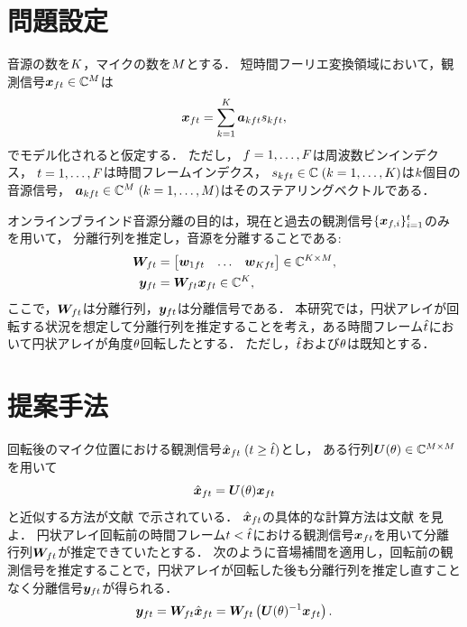 \documentclass{article}
\begin{document}
\section{問題設定}
音源の数を$K$，マイクの数を$M$とする．
短時間フーリエ変換領域において，観測信号$\bm{x} _{ft} \in \mathbb{C} ^{M}$は
\begin{equation}
  \bm{x} _{ft} = \sum _{k=1} ^{K} \bm{a} _{kft} s _{kft},
\end{equation}
でモデル化されると仮定する．
ただし，
$f = 1, \dots, F$は周波数ビンインデクス，
$t = 1, \dots, F$は時間フレームインデクス，
$s _{kft} \in \mathbb{C}\; (k = 1, \dots, K)$は$k$個目の音源信号，
$\bm{a} _{kft} \in \mathbb{C} ^{M}\; (k = 1, \dots, M)$はそのステアリングベクトルである．

オンラインブラインド音源分離の目的は，現在と過去の観測信号$\{\bm{x} _{f,i}\} _{i=1} ^{t}$のみを用いて，
分離行列を推定し，音源を分離することである:
\begin{align}
  \bm{W} _{ft} &= \begin{bmatrix} \bm{w} _{1ft} & \dots & \bm{w} _{Kft} \end{bmatrix} \in \mathbb{C} ^{K \times M}, \\
  \bm{y} _{ft} &= \bm{W} _{ft} \bm{x} _{ft} \in \mathbb{C} ^{K},
\end{align}
ここで，$\bm{W} _{ft}$は分離行列，$\bm{y} _{ft}$は分離信号である．
本研究では，円状アレイが回転する状況を想定して分離行列を推定することを考え，ある時間フレーム$\hat{t}$において円状アレイが角度$\theta$回転したとする．
ただし，$\hat{t}$および$\theta$は既知とする．

\section{提案手法}
回転後のマイク位置における観測信号$\hat{\bm{x}} _{ft}\; (t \geq \hat{t})$とし，
ある行列$\bm{U} (\theta) \in \mathbb{C} ^{M\times M}$を用いて
\begin{equation}
  \hat{\bm{x}} _{ft} = \bm{U} (\theta) \bm{x} _{ft}
\end{equation}
と近似する方法が文献 \cite{Wakabayashi:2020:ASJ:A} で示されている．
$\hat{\bm{x}} _{ft}$の具体的な計算方法は文献 \cite{Wakabayashi:2020:ASJ:A} を見よ．
円状アレイ回転前の時間フレーム$t < \hat{t}$における観測信号$\bm{x} _{ft}$を用いて分離行列$\bm{W} _{ft}$が推定できていたとする．
次のように音場補間を適用し，回転前の観測信号を推定することで，円状アレイが回転した後も分離行列を推定し直すことなく分離信号$\bm{y} _{ft}$が得られる．
\begin{equation}
  \bm{y} _{ft} = \bm{W} _{ft} \hat{\bm{x}} _{ft} = \bm{W} _{ft} \left(\bm{U} (\theta)^{-1} \bm{x} _{ft}\right).
\end{equation}
\end{document}
